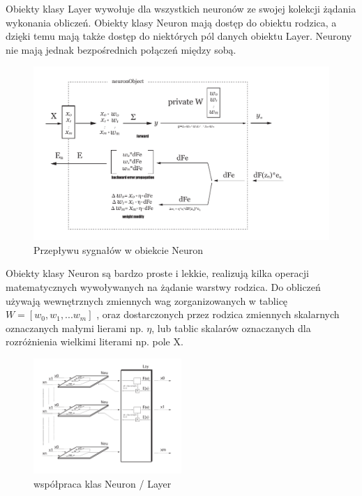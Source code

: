 Obiekty klasy Layer wywołuje dla wszystkich neuronów ze swojej kolekcji żądania wykonania obliczeń. Obiekty klasy Neuron mają dostęp do obiektu rodzica, a dzięki temu mają także dostęp do niektórych pól danych obiektu Layer. Neurony nie mają jednak bezpośrednich połączeń między sobą. 







\begin{figure}[h]
	\centering \includegraphics[width=\textwidth]{gfx/rys1_5.pdf} 
	\caption{ Przepływu sygnałów w obiekcie Neuron }
	\label{rys:modelobiektowegoneuronuszkic2}
\end{figure}

Obiekty klasy Neuron są bardzo proste i lekkie, realizują kilka operacji matematycznych wywoływanych na żądanie warstwy rodzica. Do obliczeń używają wewnętrznych zmiennych wag zorganizowanych w tablicę \( W = [ w_0, w_1, ... w_m ]\) , oraz dostarczonych przez rodzica zmiennych skalarnych oznaczanych małymi lierami np. \(\eta\), lub tablic skalarów oznaczanych dla rozróżnienia wielkimi literami np. pole X. 
 
\newpage
\begin{figure}[h]
	\centering \includegraphics[width=0.5\textwidth]{gfx/3d.pdf} 
	\caption{ współpraca klas Neuron / Layer }
	\label{rys:modelobiektowegoneuronuszkic2}
\end{figure}
